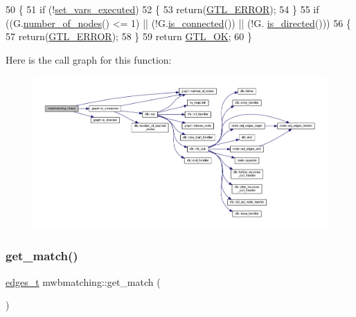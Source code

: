 \begin{DoxyCode}
50 \{
51     \textcolor{keywordflow}{if} (!\mbox{\hyperlink{classmwbmatching_ae871c52302b78ccf16a271ef099e0a3a}{set\_vars\_executed}})
52     \{
53         \textcolor{keywordflow}{return}(\mbox{\hyperlink{classalgorithm_af1a0078e153aa99c24f9bdf0d97f6710a6fcf574690bbd6cf710837a169510dd7}{GTL\_ERROR}});
54     \}
55     \textcolor{keywordflow}{if} ((G.\mbox{\hyperlink{classgraph_a42c78e0a9f115655e3ff0efe35ebfc4e}{number\_of\_nodes}}() <= 1) || (!G.\mbox{\hyperlink{classgraph_a599e2bf967df8a2052a9892c94db98b7}{is\_connected}}()) || (!G.
      \mbox{\hyperlink{classgraph_afc510be7479fa903fde9e0e615470ab0}{is\_directed}}()))
56     \{
57         \textcolor{keywordflow}{return}(\mbox{\hyperlink{classalgorithm_af1a0078e153aa99c24f9bdf0d97f6710a6fcf574690bbd6cf710837a169510dd7}{GTL\_ERROR}});
58     \}
59     \textcolor{keywordflow}{return} \mbox{\hyperlink{classalgorithm_af1a0078e153aa99c24f9bdf0d97f6710a5114c20e4a96a76b5de9f28bf15e282b}{GTL\_OK}};
60 \}
\end{DoxyCode}
Here is the call graph for this function\+:\nopagebreak
\begin{figure}[H]
\begin{center}
\leavevmode
\includegraphics[width=350pt]{classmwbmatching_af6b9e6ad6e77958ddd32301df96bae23_cgraph}
\end{center}
\end{figure}
\mbox{\label{classmwbmatching_a30af3917c3d7257e4c13f0634c41d39d}} 
\subsubsection{\texorpdfstring{get\+\_\+match()}{get\_match()}}
{\footnotesize\ttfamily \mbox{\hyperlink{edge_8h_a8f9587479bda6cf612c103494b3858e3}{edges\+\_\+t}} mwbmatching\+::get\+\_\+match (\begin{DoxyParamCaption}{ }\end{DoxyParamCaption})\hspace{0.3cm}{\ttfamily [inline]}}

